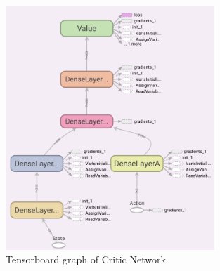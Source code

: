 \documentclass[Lau,oneside,noexaminfo]{sapthesis} %
\begin{document}
\begin{figure}[H]
\caption{Tensorboard graph of Critic Network}
\centering
\includegraphics[width=0.7\textwidth]{critic}
\end{figure}
\end{document}
